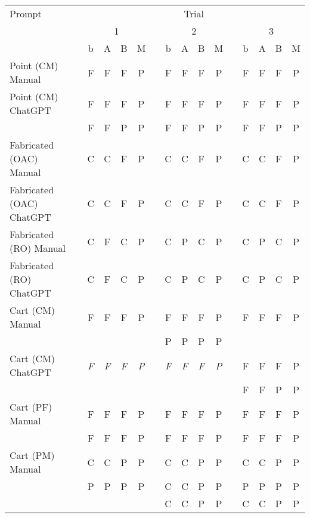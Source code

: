 \begin{table}[t]
    \centering
    \begin{tabular}{@{\extracolsep{\fill}} llcccccccccccccc}
        \toprule
        Prompt & & \multicolumn{14}{c}{Trial} \\
        \cmidrule(lr){3-16}
        & & \multicolumn{4}{c}{1} & \multicolumn{6}{c}{2} & \multicolumn{4}{c}{3} \\
                            & & b & A & B & M & & b & A & B & M & & b & A & B & M \\
\midrule
Point (CM) Manual           & & F & F & F & P & & F & F & F & P & & F & F & F & P \\
Point (CM) ChatGPT          & & F & F & F & P & & F & F & F & P & & F & F & F & P \\
                            & & F & F & P & P & & F & F & P & P & & F & F & P & P \\
Fabricated (OAC) Manual     & & C & C & F & P & & C & C & F & P & & C & C & F & P \\
Fabricated (OAC) ChatGPT    & & C & C & F & P & & C & C & F & P & & C & C & F & P \\
Fabricated (RO) Manual      & & C & F & C & P & & C & P & C & P & & C & P & C & P \\
Fabricated (RO) ChatGPT     & & C & F & C & P & & C & P & C & P & & C & P & C & P \\
Cart (CM) Manual            & & F & F & F & P & & F & F & F & P & & F & F & F & P \\
                            & &   &   &   &   & & P & P & P & P & &   &   &   &   \\
Cart (CM) ChatGPT           & & \textit{F} & \textit{F} & \textit{F} & \textit{P} & & \textit{F} & \textit{F} & \textit{F} & \textit{P} & & F & F & F & P \\ %
                            & &   &   &   &   & &   &   &   &   & & F & F & P & P \\
Cart (PF) Manual            & & F & F & F & P & & F & F & F & P & & F & F & F & P \\
                            & & F & F & F & P & & F & F & F & P & & F & F & F & P \\
Cart (PM) Manual            & & C & C & P & P & & C & C & P & P & & C & C & P & P \\
                            & & P & P & P & P & & C & C & P & P & & P & P & P & P \\
                            & &   &   &   &   & & C & C & P & P & & C & C & P & P \\

\end{tabular}
\end{table}

